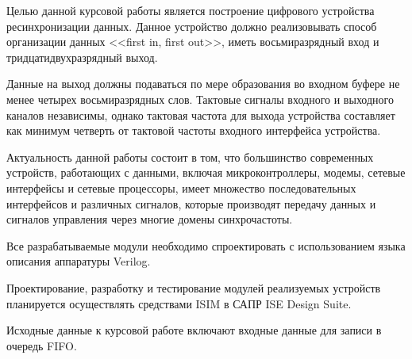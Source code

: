 \Introduction



Целью данной курсовой работы является построение цифрового устройства ресинхронизации данных. Данное устройство должно реализовывать способ организации данных <<first in, first out>>, иметь восьмиразрядный вход и тридцатидвухразрядный выход.

Данные на выход должны подаваться по мере образования во входном буфере не менее четырех восьмиразрядных слов. Тактовые сигналы входного и выходного каналов независимы, однако тактовая частота для выхода устройства составляет как минимум  четверть от тактовой частоты входного интерфейса устройства.

Актуальность данной работы состоит в том, что большинство современных устройств, работающих с данными, включая микроконтроллеры, модемы, сетевые интерфейсы и сетевые процессоры, имеет множество последовательных интерфейсов и различных сигналов, которые производят передачу данных и сигналов управления через многие домены синхрочастоты.

Все разрабатываемые модули необходимо спроектировать с использованием языка описания аппаратуры Verilog.

Проектирование, разработку и тестирование модулей реализуемых устройств планируется осуществлять средствами ISIM в САПР ISE Design Suite.

Исходные данные к курсовой работе включают входные данные для записи в очередь FIFO.


%
